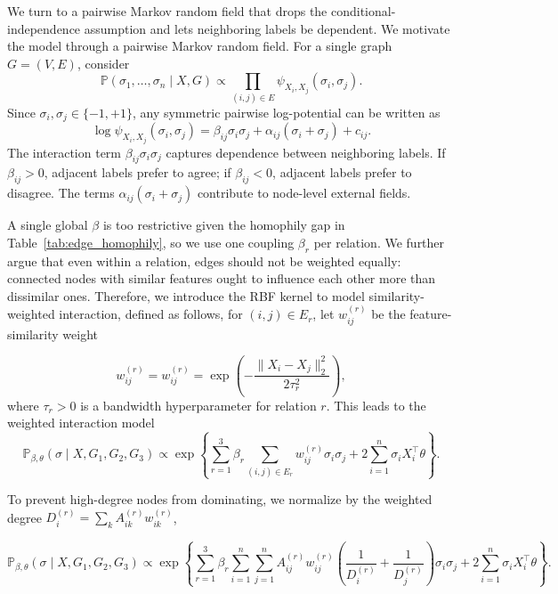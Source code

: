 \documentclass[11pt,reqno]{amsart}
\begin{document}
We turn to a pairwise Markov random field \cite{daskalakis2020logistic, mukherjee2024logistic} that drops the conditional-independence assumption and lets neighboring labels be dependent. We motivate the model through a pairwise Markov random field. For a single graph $G=(V,E)$, consider
$$
    \mathbb P(\sigma_1,\ldots,\sigma_n\mid X,G)
    \propto
    \prod_{(i,j)\in E}
    \psi_{X_i,X_j}(\sigma_i,\sigma_j).
$$
Since $\sigma_i,\sigma_j\in\{-1,+1\}$, any symmetric pairwise log-potential
can be written as
$$
    \log \psi_{X_i,X_j}(\sigma_i,\sigma_j)
    =
    \beta_{ij}\sigma_i\sigma_j
    +
    \alpha_{ij}(\sigma_i+\sigma_j)
    +
    c_{ij}.
$$
The interaction term $\beta_{ij}\sigma_i\sigma_j$ captures dependence between
neighboring labels. If $\beta_{ij}>0$, adjacent labels prefer to agree; if
$\beta_{ij}<0$, adjacent labels prefer to disagree. The terms
$\alpha_{ij}(\sigma_i+\sigma_j)$ contribute to node-level external fields.

A single global $\beta$ is too restrictive given the homophily gap in Table~\ref{tab:edge_homophily}, so we use one coupling $\beta_r$ per relation. We further argue that even within a relation, edges should not be weighted equally: connected nodes with similar features ought to influence each other more than dissimilar ones. Therefore, we introduce the RBF kernel to model similarity-weighted interaction, defined as follows, for $(i,j) \in E_r$, let $w_{ij}^{(r)}$ be the feature-similarity weight 

\[w_{ij}^{(r)} = w_{ij}^{(r)}
    =
    \exp\left(
    -\frac{\|X_i-X_j\|_2^2}{2\tau_r^2}
    \right),\]
where $\tau_r > 0$ is a bandwidth hyperparameter for relation $r$. 
This leads to the weighted interaction model
$$
    \mathbb P_{\beta,\theta}(\sigma\mid X,G_1,G_2,G_3)
    \propto
    \exp\left\{
    \sum_{r=1}^3
    \beta_r
    \sum_{(i,j)\in E_r}
    w_{ij}^{(r)}\sigma_i\sigma_j
    +
    2\sum_{i=1}^n\sigma_i X_i^\top\theta
    \right\}.
$$


To prevent high-degree nodes from dominating, we normalize by the weighted degree $D_i^{(r)} = \sum_k A_{ik}^{(r)} w_{ik}^{(r)}$, 

\[
    \mathbb P_{\beta,\theta}(\sigma\mid X,G_1,G_2,G_3)
    \propto
    \exp\left\{
    \sum_{r=1}^3
    \beta_r
    \sum_{i=1}^n
    \sum_{j=1}^n
    A_{ij}^{(r)}w_{ij}^{(r)}
    \left(
    \frac{1}{D_i^{(r)}}+\frac{1}{D_j^{(r)}}
    \right)
    \sigma_i\sigma_j
    +
    2\sum_{i=1}^n \sigma_i X_i^\top\theta
    \right\}.
\]
\end{document}
